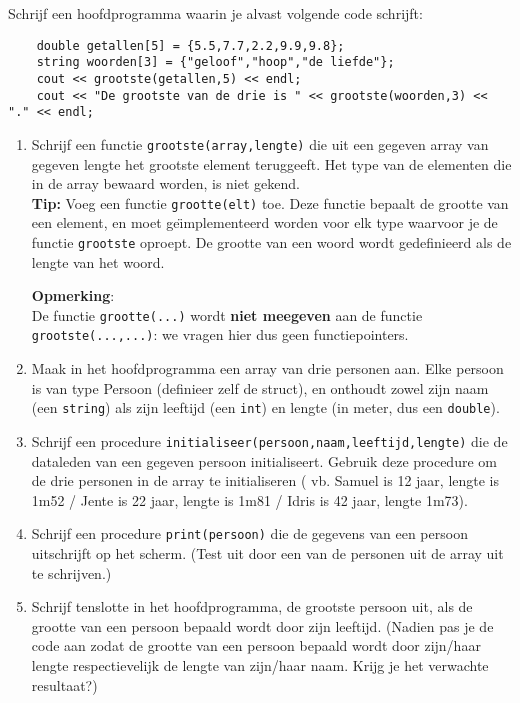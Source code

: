 \beginoef

Schrijf een hoofdprogramma waarin je alvast volgende code schrijft:
\begin{verbatim}
	double getallen[5] = {5.5,7.7,2.2,9.9,9.8};
	string woorden[3] = {"geloof","hoop","de liefde"};		
	cout << grootste(getallen,5) << endl;
	cout << "De grootste van de drie is " << grootste(woorden,3) << "." << endl;
\end{verbatim}

\begin{enumerate}
\item Schrijf een functie \verb}grootste(array,lengte)} die uit een gegeven array van gegeven lengte het grootste element teruggeeft.
Het type van de elementen die in de array bewaard worden, is niet gekend. 
\\{\bf Tip:} Voeg een functie \verb}grootte(elt)} toe. Deze functie bepaalt de grootte van een element, en moet ge\"\i mplementeerd worden voor elk type waarvoor je de functie \verb}grootste} oproept. De grootte van een woord wordt gedefinieerd als de lengte van het woord.

{\bf Opmerking}: 
\\De functie \verb}grootte(...)} wordt {\bf niet meegeven} aan de functie \verb}grootste(...,...)}: we vragen hier dus geen functiepointers. 

\item Maak in het hoofdprogramma een array van drie personen aan. Elke persoon is van type Persoon (definieer zelf de struct), 
en onthoudt zowel zijn naam (een \verb{string{) als zijn leeftijd (een \verb{int{) en lengte (in meter, dus een \verb{double{).

\item Schrijf een procedure \verb}initialiseer(persoon,naam,leeftijd,lengte)} die de dataleden van een gegeven persoon initialiseert.
Gebruik deze procedure om de drie personen in de array te initialiseren ( vb. Samuel is 12 jaar, lengte is 1m52 / Jente is 22 jaar, lengte is 1m81 / Idris is 42 jaar, lengte 1m73).
\item Schrijf een procedure \verb}print(persoon)} die de gegevens van een persoon uitschrijft op het scherm. (Test uit door een van de personen uit de array uit te schrijven.)
\item Schrijf tenslotte in het hoofdprogramma, de grootste persoon uit, als de grootte van een persoon bepaald wordt door zijn leeftijd.
(Nadien pas je de code aan zodat de grootte van een persoon bepaald wordt door zijn/haar lengte respectievelijk de lengte van zijn/haar naam. Krijg je het verwachte resultaat?)
\end{enumerate}
\endoef
